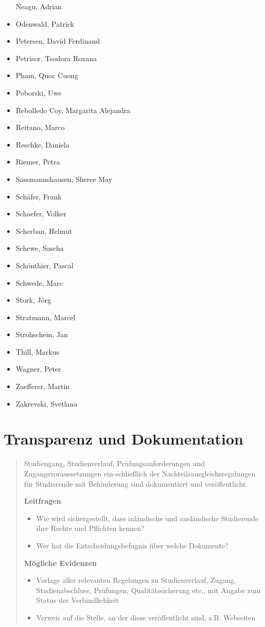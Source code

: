 \begin{itemize}
  Neagu, Adrian
\item
  Odenwald, Patrick
\item
  Petersen, David Ferdinand
\item
  Petrisor, Teodora Roxana
\item
  Pham, Quoc Cuong
\item
  Poborski, Uwe
\item
  Rebolledo Coy, Margarita Alejandra
\item
  Reitano, Marco
\item
  Reschke, Daniela
\item
  Riemer, Petra
\item
  Sassmannshausen, Sheree May
\item
  Schäfer, Frank
\item
  Schaefer, Volker
\item
  Scherban, Helmut
\item
  Schewe, Sascha
\item
  Schönthier, Pascal
\item
  Schwede, Marc
\item
  Stork, Jörg
\item
  Stratmann, Marcel
\item
  Strohschein, Jan
\item
  Thill, Markus
\item
  Wagner, Peter
\item
  Zaefferer, Martin
\item
  Zakrevski, Svetlana
\end{itemize}

\chapter{Transparenz und
Dokumentation}\label{transparenz-und-dokumentation}

\begin{quote}
Studiengang, Studienverlauf, Prüfungsanforderungen und
Zugangsvoraussetzungen ein-schließlich der Nachteilsausgleichsregelungen
für Studierende mit Behinderung sind dokumentiert und veröffentlicht.

\textbf{Leitfragen}

\begin{itemize}
\item
  Wie wird sichergestellt, dass inländische und ausländische Studierende
  ihre Rechte und Pflichten kennen?
\item
  Wer hat die Entscheidungsbefugnis über welche Dokumente?
\end{itemize}

\textbf{Mögliche Evidenzen}

\begin{itemize}
\item
  Vorlage aller relevanten Regelungen zu Studienverlauf, Zugang,
  Studienabschluss, Prüfungen, Qualitätssicherung etc., mit Angabe zum
  Status der Verbindlichkeit
\item
  Verweis auf die Stelle, an der diese veröffentlicht sind, z.B.
  Webseiten
\end{itemize}
\end{quote}


